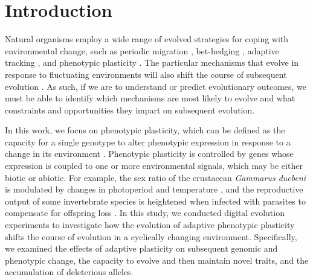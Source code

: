 
\section{Introduction}

Natural organisms employ a wide range of evolved strategies for coping with environmental change, such as
periodic migration \citep{winger_long_2019},
bet-hedging \citep{beaumont_experimental_2009},
adaptive tracking \citep{barrett_adaptation_2008},
and phenotypic plasticity \citep{ghalambor_adaptive_2007}.
The particular mechanisms that evolve in response to fluctuating environments will also shift the course of subsequent evolution \citep{wennersten_population-level_2012,schaum_plasticity_2014}.
As such, if we are to understand or predict evolutionary outcomes, we must be able to identify which mechanisms are most likely to evolve and what constraints and opportunities they impart on subsequent evolution.

In this work, we focus on phenotypic plasticity, which can be defined as the capacity for a single genotype to alter phenotypic expression in response to a change in its environment \citep{west-eberhard_developmental_2003}.
Phenotypic plasticity is controlled by genes whose expression is coupled to one or more environmental signals, which may be either biotic or abiotic.
For example, the sex ratio of the crustacean \textit{Gammarus duebeni} is modulated by changes in photoperiod and temperature \citep{dunn_two_2005}, and the reproductive output of some invertebrate species is heightened when infected with parasites to compensate for offspring loss \citep{chadwick_parasite-mediated_2005}.
In this study, we conducted digital evolution experiments to investigate how the evolution of adaptive phenotypic plasticity shifts the course of evolution in a cyclically changing environment.
Specifically, we examined the effects of adaptive plasticity on subsequent genomic and phenotypic change, the capacity to evolve and then maintain novel traits, and the accumulation of deleterious alleles.


